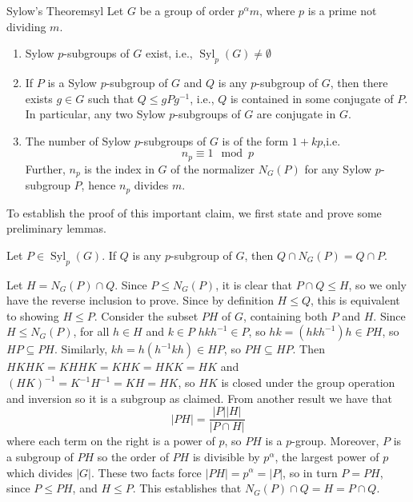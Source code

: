 \documentclass[12pt, a4paper, twoside, openright, titlepage]{book}
\begin{document}
\begin{namthm}{Sylow's Theorem}{syl}
    Let $G$ be a group of order $p^{\alpha}m$, where $p$ is a prime not dividing $m$.\begin{enumerate}
        \item Sylow $p$-subgroups of $G$ exist, i.e., $\operatorname{Syl}_p(G) \neq \emptyset$
        \item If $P$ is a Sylow $p$-subgroup of $G$ and $Q$ is any $p$-subgroup of $G$, then there exists $g \in G$ such that $Q\leq gPg^{-1}$, i.e., $Q$ is contained in some conjugate of $P$. In particular, any two Sylow $p$-subgroups of $G$ are conjugate in $G$.
        \item The number of Sylow $p$-subgroups of $G$ is of the form $1+kp$,i.e. \begin{equation*}
                n_p \equiv 1\mod p
        \end{equation*}
            Further, $n_p$ is the index in $G$ of the normalizer $N_G(P)$ for any Sylow $p$-subgroup $P$, hence $n_p$ divides $m$.
    \end{enumerate}
\end{namthm}

To establish the proof of this important claim, we first state and prove some preliminary lemmas.

\begin{lem}{}{}
    Let $P\in \operatorname{Syl}_p(G)$. If $Q$ is any $p$-subgroup of $G$, then $Q\cap N_G(P) = Q\cap P$.
\end{lem}
\begin{proof*}{}{}
    Let $H = N_G(P) \cap Q$. Since $P \leq N_G(P)$, it is clear that $P\cap Q \leq H$, so we only have the reverse inclusion to prove. Since by definition $H \leq Q$, this is equivalent to showing $H \leq P$. Consider the subset $PH$ of $G$, containing both $P$ and $H$. Since $H \leq N_G(P)$, for all $h \in H$ and $k \in P$ $hkh^{-1} \in P$, so $hk = (hkh^{-1})h \in PH$, so $HP \subseteq PH$. Similarly, $kh = h(h^{-1}kh) \in HP$, so $PH \subseteq HP$. Then $HKHK = KHHK = KHK = HKK= HK$ and $(HK)^{-1} = K^{-1}H^{-1} = KH = HK$, so $HK$ is closed under the group operation and inversion so it is a subgroup as claimed. From another result we have that \begin{equation*}
        |PH| = \frac{|P||H|}{|P\cap H|}
    \end{equation*}
    where each term on the right is a power of $p$, so $PH$ is a $p$-group. Moreover, $P$ is a subgroup of $PH$ so the order of $PH$ is divisible by $p^{\alpha}$, the largest power of $p$ which divides $|G|$. These two facts force $|PH| = p^{\alpha} = |P|$, so in turn $P = PH$, since $P \leq PH$, and $H \leq P$. This establishes that $N_G(P)\cap Q = H = P\cap Q$.
\end{proof*}
\end{document}
